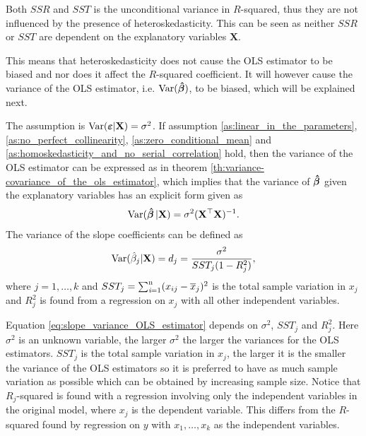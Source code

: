 Both $SSR$ and $SST$ is the unconditional variance in $R$-squared, thus they are not influenced by the presence of heteroskedasticity. 
This can be seen as neither $SSR$ or $SST$ are dependent on the explanatory variables $\textbf{X}$.

This means that heteroskedasticity does not cause the OLS estimator to be biased and nor does it affect the $R$-squared coefficient. 
It will however cause the variance of the OLS estimator, i.e. $\operatorname{\text{Var}}(\operatorname{\boldsymbol{\hat{\beta}}})$, to be biased, which will be explained next.  

The \homo assumption is $\operatorname{\text{Var}}(\boldsymbol{\varepsilon} | \mathbf{X}) = \sigma^2$. 
If assumption \ref{as:linear_in_the_parameters}, \ref{as:no_perfect_collinearity}, \ref{as:zero_conditional_mean} and \ref{as:homoskedasticity_and_no_serial_correlation} hold, then the variance of the OLS estimator can be expressed as in theorem \ref{th:variance-covariance_of_the_ols_estimator}, which implies that the variance of $\operatorname{\boldsymbol{\hat{\beta}}}$ given the explanatory variables has an explicit form given as
\begin{align*}
    \operatorname{\text{Var}}(\operatorname{\boldsymbol{\hat{\beta}}} | \mathbf{X}) = \sigma^2(\mathbf{X}^\top\mathbf{X})^{-1}.
\end{align*}
The variance of the slope coefficients can be defined as
\begin{align}\label{eq:slope_variance_OLS_estimator}
    \operatorname{\text{Var}}(\hat{\beta}_j|\mathbf{X}) = d_j = \dfrac{\sigma^2}{SST_j(1- R_j^2)},
\end{align}
where $j = 1, \ldots, k$ and $SST_j = \operatorname{\sum_{\textit{i}=1}^n} (x_{ij} - \overline{x}_j)^2$ is the total sample variation in $x_j$ and $R^2_j$ is found from a regression on $x_j$ with all other independent variables. 

Equation \eqref{eq:slope_variance_OLS_estimator} depends on $\sigma^2$, $SST_j$ and $R^2_j$.
Here $\sigma^2$ is an unknown variable, the larger $\sigma^2$ the larger the variances for the OLS estimators. 
$SST_j$ is the total sample variation in $x_j$, the larger it is the smaller the variance of the OLS estimators so it is preferred to have as much sample variation as possible which can be obtained by increasing sample size. 
Notice that $R_j$-squared is found with a regression involving only the independent variables in the original model, where $x_j$ is the dependent variable. 
This differs from the $R$-squared found by regression on $y$ with $x_1, \ldots, x_k$ as the independent variables. 

